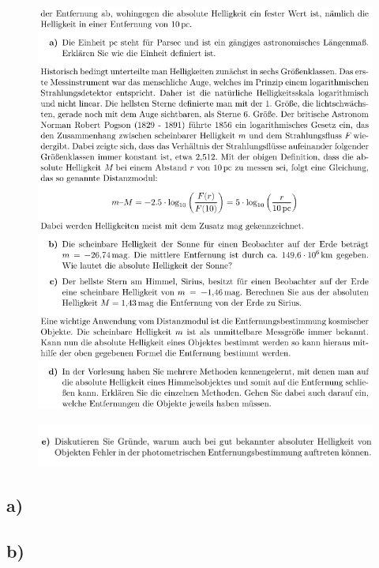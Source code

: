     \begin{figure}[H]
        \centering
        \includegraphics[width=\textwidth]{images/Aufgabe11_2.jpg}
        \label{fig:3}
    \end{figure}

    \begin{figure}[H]
        \centering
        \includegraphics[width=\textwidth]{images/Aufgabe11_3.jpg}
        \label{fig:4}
    \end{figure}

    \subsection{a)}

    \subsection{b)}

